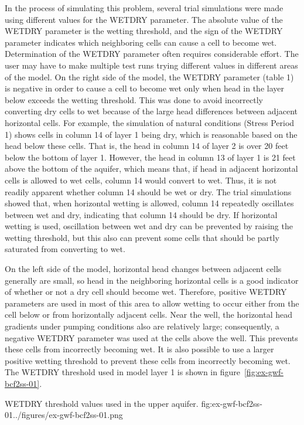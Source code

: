 In the process of simulating this problem, several trial simulations were made using different values for the WETDRY parameter. The absolute value of the WETDRY parameter is the wetting threshold, and the sign of the WETDRY parameter indicates which neighboring cells can cause a cell to become wet. Determination of the WETDRY parameter often requires considerable effort. The user may have to make multiple test runs trying different values in different areas of the model. On the right side of the model, the
WETDRY parameter (table 1) is negative in order to cause a cell to become wet only when head in the layer below exceeds the wetting threshold. This was done to avoid incorrectly converting dry cells to wet because of the large head differences between adjacent horizontal cells. For example, the simulation of natural conditions (Stress Period 1) shows cells in column 14 of layer 1 being dry, which is reasonable based on the head below these cells. That is, the head in column 14 of layer 2 is over 20 feet below the bottom of layer 1. However, the head in column 13 of layer 1 is 21 feet above the bottom of the aquifer, which means that, if head in adjacent horizontal cells is allowed to wet cells, column 14 would convert to wet. Thus, it is not readily apparent whether column 14 should be wet or dry. The trial simulations showed that, when horizontal wetting is allowed, column 14 repeatedly oscillates between wet and dry, indicating that column 14 should be dry. If horizontal wetting is used, oscillation between wet and dry can be prevented by raising the wetting threshold, but this also can prevent some cells that should be partly saturated from converting to wet.

On the left side of the model, horizontal head changes between adjacent cells generally are small, so head in the neighboring horizontal cells is a good indicator of whether or not a dry cell should become wet. Therefore, positive WETDRY parameters are used in most of this area to allow wetting to occur either from the cell below or from horizontally adjacent cells. Near the well, the horizontal head gradients under pumping conditions also are relatively large; consequently, a negative WETDRY parameter was used at the cells above the well. This prevents these cells from incorrectly becoming wet. It is also possible to use a larger positive wetting threshold to prevent these cells from incorrectly becoming wet. The WETDRY threshold used in model layer 1 is shown in figure~\ref{fig:ex-gwf-bcf2ss-01}.

\begin{StandardFigure}{
                                     WETDRY threshold values used in the upper aquifer.
                                     }{fig:ex-gwf-bcf2ss-01}{../figures/ex-gwf-bcf2ss-01.png}
\end{StandardFigure}                                 


